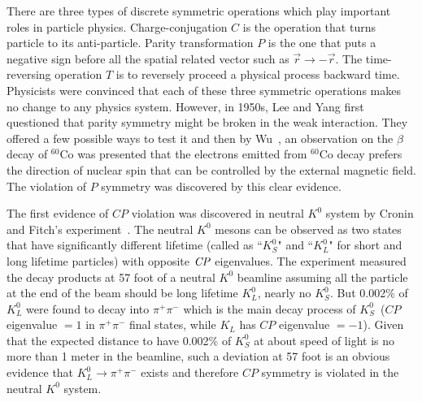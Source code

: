 There are three types of discrete symmetric operations which play important roles in particle physics. Charge-conjugation $\textit{C}$ is the operation that turns particle to its anti-particle. Parity transformation $\textit{P}$  is the one that puts a negative sign before all the spatial related vector such as $\overrightarrow{r} \to -\overrightarrow{r}$. The time-reversing operation $\textit{T}$ is to reversely proceed a physical process backward time.  Physicists were convinced that each of these three symmetric operations makes no change to any physics system. However, in 1950s, Lee and Yang \cite{PhysRev.104.254} first questioned that parity symmetry might be broken in the weak interaction. They offered a few possible ways to test it and then by Wu~\cite{Wuexp}, an observation on the $\beta$ decay of $^{60}$Co was presented that the electrons emitted from  $^{60}$Co decay prefers the direction of nuclear spin that can be controlled by the external magnetic field. The violation of $P$ symmetry was discovered by this clear evidence. 

\begin{comment}
\begin{figure}[htbp]
\centering
\texttt{[image: DsBxU.jpg]}
\caption{$^{60}$Co decay violates the parity because of the unbalance of electron emissions\cite{wu_exp}}
\label{fig:Co60}
\end{figure}
\end{comment}

The first evidence of $CP$ violation was discovered in neutral $K^0$ system by Cronin and Fitch's experiment~\cite{christenson1964evidence}. The neutral $K^0$ mesons can be observed as two states that have significantly different lifetime (called as ``$K_S^0$" and ``$K_L^0$" for short and long lifetime particles) with opposite $\it{CP}$ eigenvalues. The experiment measured the decay products at 57 foot of a neutral $K^0$ beamline assuming all the particle at the end of the beam should be long lifetime $K_L^0$, nearly no $K_S^0$. But 0.002\% of $K^0_L$ were found to decay into $\pi^+\pi^-$ which is the main decay process of $K_S^0$~($CP$ eigenvalue $=1$ in $\pi^+\pi^-$ final states, while $K_L$ has  $CP$ eigenvalue $=-1$). Given that the expected distance to have 0.002\% of $K_S^0$ at about speed of light is no more than 1 meter in the beamline, such a deviation at 57 foot is an obvious evidence that $K_L^0 \to \pi^+\pi^- $ exists and therefore $CP$ symmetry is violated in the neutral $K^0$ system.


